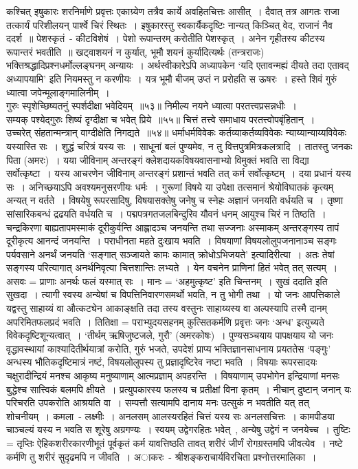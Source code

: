  कश्चित् इषुकारः  शरनिर्माणे प्रवृत्तः एकाग्र्येण तत्रैव कार्ये अवहितचित्तः आसीत्~। दैवात् तत्र आगतः राजा तत्कार्यं परिशीलयन् पार्श्वे चिरं स्थितः~। इषुकारस्तु स्वकार्यैकदृष्टिः नान्यत् किञ्चित् वेद, राजानं नैव ददर्श~॥
 पेशस्कृतं~- कीटविशेषं~। पेशो रूपान्तरम् करोतीति पेशस्कृत्~। अनेन गृहीतस्य कीटस्य रूपान्तरं भवतीति~॥
खट्वाशयनं न कुर्यात्, भूमौ शयनं कुर्यादित्यर्थः
(तन्त्रराजः)
भक्तिश्रद्धादिप्रश्नधर्मोल्लङ्घनम् अन्यायः~।
अर्थस्वीकारेऽपि अध्यापकेन ‘यदि एतावन्मह्यं दीयते तदा एतावद् अध्यापयामि’ इति नियमस्तु न करणीयः~।
यत्र भूमौ बीजम् उप्तं न प्ररोहति स ऊषरः~।
हस्ते शिवं गुरुं ध्यात्वा जपेन्मूलाङ्गमालिनीम्~।\\  गुरुः स्पृशेच्छिष्यतनुं स्पर्शदीक्षा भवेदियम्~॥५३॥
 निमील्य नयने ध्यात्वा परतत्त्वप्रसन्नधीः~।\\  सम्यक् पश्येद्गुरुः शिष्यं दृग्दीक्षा च भवेत् प्रिये~॥५५॥
 चित्तं तत्त्वे समाधाय परतत्त्वोपबृंहितान्~।\\  उच्चरेत् संहतान्मन्त्रान् वाग्दीक्षेति निगद्यते~॥५४॥
धर्माधर्मविवेकः कर्तव्याकर्तव्यविवेकः न्याय्यान्याय्यविवेकः यस्यास्ति सः~।
शुद्धं चरित्रं यस्य सः~।
साधूनां बलं पुण्यमेव, न तु वित्तपुत्रमित्रकलत्रादि~।
तातस्तु जनकः पिता (अमरः)~।
यया जीविनाम् अन्तरङ्गं क्लेशदायकविषयवासनाभ्यो विमुक्तं भवति सा विद्या सर्वोत्कृष्टा~।
यस्य आचरणेन जीविनाम् अन्तरङ्गं प्रशान्तं भवति तत् कर्म सर्वोत्कृष्टम्~।
दया प्रधानं यस्य सः~।
अनिच्छयाऽपि अवश्यमनुसरणीयः धर्मः~।
गुरूणां विषये या उपेक्षा तत्समानं श्रेयोविघातकं कृत्यम् अन्यत् न वर्तते~।
विषयेषु रूपरसादिषु, विषयासक्तेषु जनेषु च स्नेहः अज्ञानं जनयति वर्धयति च~।
तृष्णा सांसारिकबन्धं द्रढयति वर्धयति च~। 
पद्मपत्रगतजलबिन्दुरिव यौवनं धनम् आयुश्च चिरं न तिष्ठति~।
चन्द्रकिरणा  बाह्यतापमस्माकं दूरीकुर्वन्ति आह्लादञ्च जनयन्ति तथा सज्जनाः अस्माकम् अन्तरङ्गस्य तापं दूरीकृत्य आनन्दं जनयन्ति~। 
 पराधीनता महते दुःखाय भवति~।
 विषयाणां विषयलोलुपजनानाञ्च सङ्गः पर्यवसाने अनर्थं जनयति ‘सङ्गात् सञ्जायते कामः  कामात् क्रोधोऽभिजयते’ इत्यादिरीत्या~। अतः तेषां सङ्गस्य परित्यागात् अनर्थनिवृत्या चित्तशान्तिः लभ्यते~।
 येन वचनेन प्राणिनां हितं भवेत् तत् सत्यम्~।
असवः = प्राणाः
अनर्थः फलं यस्मात् सः~। मानः = ‘अहमुत्कृष्ट’ इति चिन्तनम्~।
सुखं ददाति इति सुखदा~।
त्यागी स्वस्य अन्येषां च विपत्तिनिवारणसमर्थो भवति, न तु भोगी तथा~।
यो जनः आपत्तिकाले यद्वस्तु साहाय्यं वा औत्कट्येन आकाङ्क्षति तदा तस्य वस्तुनः साहाय्यस्य वा अल्पस्यापि तस्मै दानम् अपरिमितफलप्रदं भवति~।
तितिक्षा = पराभ्युदयसहनम्
कुत्सितकर्मणि प्रवृत्तः  जनः ‘अन्ध’ इत्युच्यते विवेकदृष्टिशून्यत्वात्~।
‘तीर्थम् ऋषिजुष्टजले, गुरौ’ (अमरकोषः)~। पुण्यसञ्चयाय पापक्षयाय यो जनः वृद्धावस्थायां काश्यादितीर्थयात्रां करोति,  गुरुं भजते,  उपदेशं प्राप्य भक्तिज्ञानसाधनाय प्रयततेस ‘पङ्गुः’
अन्धस्य भौतिकदृष्टिमात्रं नष्टं, विषयलोलुपस्य तु प्रज्ञादृष्टिरेव नष्टा भवति~।
विषयाः रूपरसादयः चक्षुरादीन्द्रियं मनश्च आकृष्य मनुष्याणाम् आत्मप्रज्ञाम्  अपहरन्ति~। विषयाणाम् उपभोगेन इन्द्रियाणां मनसः बुद्धेश्च सात्त्विकं बलमपि क्षीयते~।
प्रत्युपकारस्य फलस्य च प्रतीक्षां विना कृतम्~।
नीचान् दुष्टान् जनान् यः परिचरति उपकरोति आश्रयति वा~।
सम्पत्तौ सत्यामपि दानाय मनः उत्सुकं न भवतीति यत् तत् शोचनीयम्~।
कमला~- लक्ष्मीः~। अनलसम् आलस्यरहितं चित्तं यस्य सः अनलसचित्तः~।
कामपीडया चाञ्चल्यं यस्य न भवति  स शूरेषु अग्रगण्यः~।
स्वयम् उद्वेगरहितः भवेत्~,  अन्येषु उद्वेगं न जनयेच्च~।
तुष्टिः = तृप्तिः
ऐहिकशरीरकारणीभूतं पूर्वकृतं कर्म यावत्तिष्ठति तावत् शरीरं जीर्णं रोगग्रस्तमपि जीवत्येव~। नष्टे कर्मणि तु शरीरं सुदृढमपि न जीवति~।
 अाकरः~- श्रीशङ्कराचार्यविरचिता प्रश्नोत्तरमालिका~।
